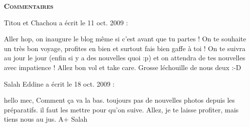 \bigskip
\textbf{\textsc{Commentaires}}

\medskip
Titou et Chachou a écrit le 11 oct. 2009 :
\begin{displayquote}
Aller hop, on inaugure le blog même si c'est avant que tu partes !
On te souhaite un très bon voyage, profites en bien et surtout fais bien gaffe à toi !
On te suivra au jour le jour (enfin si y a des nouvelles quoi :p) et on attendra de tes nouvelles avec impatience !
Allez bon vol et take care.
Grosse léchouille de nous deux :-D
\end{displayquote}

\medskip
Salah Eddine a écrit le 18 oct. 2009 :
\begin{displayquote}
hello mec,
Comment ça va la bas. toujours pas de nouvelles photos depuis les préparatifs. il faut les mettre pour qu'on suive.
Allez, je te laisse profiter, mais tiens nous au jus.
A+
Salah
\end{displayquote}
